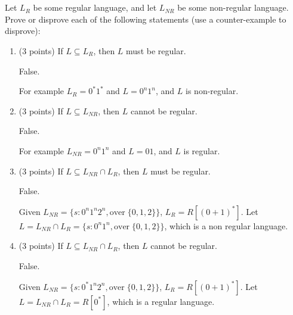 \documentclass[paper=a4, fontsize=11pt]{scrartcl} %
\begin{document}
\pagebreak

\section{}

\begin{fancyquotes}
  Let $L_R$ be some regular language, and let $L_{NR}$ be some
  non-regular language. Prove or disprove each of the following
  statements (use a counter-example to disprove):
\end{fancyquotes}

\begin{enumerate}
\item
  \begin{fancyquotes}
    (3 points) If $L \subseteq L_R$, then $L$ must be regular.
  \end{fancyquotes}

  False.

  For example $L_R = 0^*1^*$ and $L = 0^n1^n$, and $L$ is non-regular.

\item
  \begin{fancyquotes}
    (3 points) If $L \subseteq L_{NR}$, then $L$ cannot be regular.
  \end{fancyquotes}

  False.

  For example $L_{NR} = 0^n1^n$ and $L = 01$, and $L$ is regular.

\item
  \begin{fancyquotes}
    (3 points) If $L \subseteq L_{NR} \cap L_R$, then $L$ must be regular.
  \end{fancyquotes}

  False.

  Given $L_{NR}=\{s: 0^n1^n2^n, \text{over}\;\{0,1,2\}\}$,
  $L_{R}=R[{(0+1)}^*]$. Let $L = L_{NR}\cap L_R = \{s: 0^n1^n,
  \text{over}\;\{0,1,2\}\}$, which is a non regular language.

\item
  \begin{fancyquotes}
    (3 points) If $L \subseteq L_{NR} \cap L_R$, then $L$ cannot be regular.
  \end{fancyquotes}

  False.

  Given $L_{NR}=\{s: 0^*1^n2^n, \text{over}\;\{0,1,2\}\}$,
  $L_{R}=R[{(0+1)}^*]$. Let $L = L_{NR}\cap L_R = R[0^*]$, which is a
  regular language.


\end{enumerate}
\end{document}

